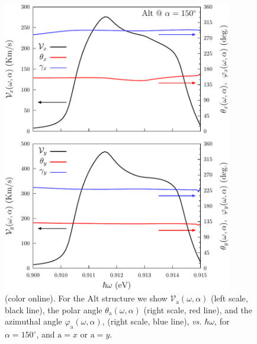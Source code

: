 \documentclass[floatfix,prb,aps,superscriptaddress,showpacs,11pt,preprint,letterpaper]{revtex4}
\def\tama{10cm}
\begin{document}
\begin{figure}[tb]
\centering
\includegraphics[width=\tama]{figures/fig10}
\caption{(color online). For the Alt structure we show
$\mathcal{V}_{\mathrm{a}} (\omega,\alpha)$ (left scale, black line), the polar
angle $\theta_{\mathrm{a}} (\omega,\alpha)$ (right scale, red line), and the
azimuthal angle $\varphi_{\mathrm{a}} (\omega,\alpha)$, (right scale, blue
line), {\it vs.} $\hbar\omega$, for $\alpha=150^\circ$, and $\mathrm{a}=x$ or
$\mathrm{a}=y$. }
\label{fig:alt-vx-vy-w2}
\end{figure}
\end{document}
